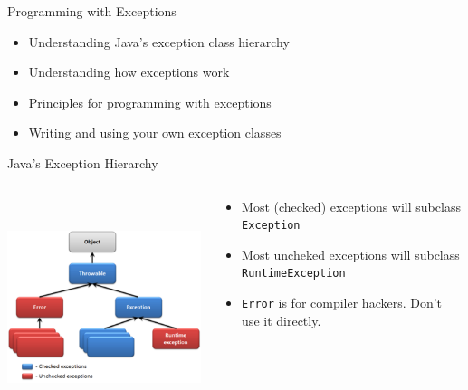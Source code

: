 \documentclass{beamer}
\author[Chris Simpkins] 
{Christopher Simpkins \\\texttt{chris.simpkins@gatech.edu}}
\institute[Georgia Tech] %
\date[CS 1331]{}
\begin{document}
\begin{frame}
  \titlepage
\end{frame}


\begin{frame}[fragile]{Programming with Exceptions}

\begin{itemize}
\item Understanding Java's exception class hierarchy
\item Understanding how exceptions work
\item Principles for programming with exceptions
\item Writing and using your own exception classes
\end{itemize}

\end{frame}

\begin{frame}[fragile]{Java's Exception Hierarchy}

\begin{columns}[t]
\begin{column}{2in}
\begin{center}
\includegraphics[height=2.5in]{hierarchy_of_java_exceptions.png}
\end{center}
\end{column}
\begin{column}{3in}
\begin{itemize}
\item Most (checked) exceptions will subclass {\tt Exception}
\item Most uncheked exceptions will subclass {\tt RuntimeException}
\item {\tt Error} is for compiler hackers.  Don't use it directly.
\end{itemize}
\end{column}
\end{columns}

\end{frame}
\end{document}
